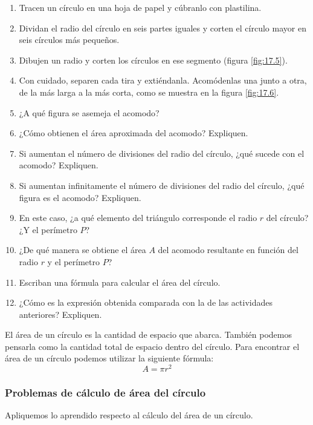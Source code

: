 \documentclass[11pt]{book}
\begin{document}
\begin{enumerate}
        \begin{enumerate}
          \item Tracen un círculo en una hoja de papel y cúbranlo con plastilina.
          \item Dividan el radio del círculo en seis partes iguales y corten el círculo mayor en seis círculos más pequeños.
          \item Dibujen un radio y corten los círculos en ese segmento (figura \ref{fig:17.5}).
          \item Con cuidado, separen cada tira y extiéndanla. Acomódenlas una junto a otra, de la más larga a la más corta, como se muestra en la figura \ref{fig:17.6}.
          \item ¿A qué figura se asemeja el acomodo?
          \item ¿Cómo obtienen el área aproximada del acomodo? Expliquen.
          \item Si aumentan el número de divisiones del radio del círculo, ¿qué sucede con el acomodo? Expliquen.
          \item Si aumentan infinitamente el número de divisiones del radio del círculo, ¿qué figura es el acomodo? Expliquen.
          \item En este caso, ¿a qué elemento del triángulo corresponde el radio $r$ del círculo? ¿Y el perímetro $P$?
          \item ¿De qué manera se obtiene el área $A$ del acomodo resultante en función del radio $r$ y el perímetro $P$?
          \item Escriban una fórmula para calcular el área del círculo.
          \item ¿Cómo es la expresión obtenida comparada con la de las actividades anteriores? Expliquen.
        \end{enumerate}

        \begin{boxH}
          El área de un círculo es la cantidad de espacio que abarca. También podemos pensarla como la cantidad total de espacio dentro del círculo.
          Para encontrar el área de un círculo podemos utilizar la siguiente fórmula:
          \[A=\pi r^2\]
        \end{boxH}

        \subsubsection{Problemas de cálculo de área del círculo}

        Apliquemos lo aprendido respecto al cálculo del área de un círculo.


\end{enumerate}
\end{document}
